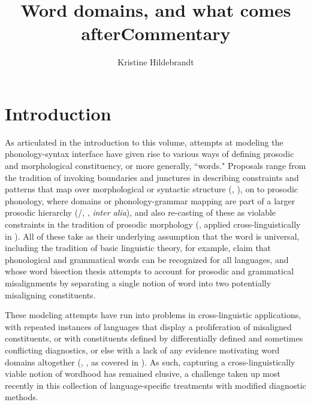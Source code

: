 \documentclass[output=paper]{langscibook}
\author{Kristine Hildebrandt\orcid{}\affiliation{Southern Illinois University Edwardsville}}
\title{Word domains, and what comes after}
\begin{document}
\maketitle 

\title{Commentary}

\section{Introduction}

As articulated in the introduction to this volume, attempts at modeling the pho\-nol\-ogy-syntax interface have given rise to various ways of defining prosodic and morphological constituency, or more generally, ``words." Proposals range from the tradition of invoking boundaries and junctures in describing constraints and patterns that map over morphological or syntactic structure (\citealt{chomsky_sound_1968}, \citealt{mccawley_phonological_1968}), on to prosodic phonology, where domains or phonology-grammar mapping are part of a larger prosodic hierarchy (\citealt{nespor_prosodic_1986}{\slash}\citeyear{nespor2007prosodic}, \citealt{truckenbrodt_relation_1999}, \textit{inter alia}), and also re-casting of these as violable constraints in the tradition of prosodic morphology (\citealt{mccarthy_prosodic_1986, mccarthy_prosodic_2001}, applied cross-linguistically in \citealt{kager1999prosody}). All of these take as their underlying assumption that the word is universal, including the tradition of basic linguistic theory, for example, \citet{dixon_basic_2010} claim that phonological and grammatical words can be recognized for all languages, and whose word bisection thesis attempts to account for prosodic and grammatical misalignments by separating a single notion of word into two potentially misaligning constituents.

These modeling attempts have run into problems in cross-linguistic applications, with repeated instances of languages that display a proliferation of misaligned constituents, or with constituents defined by differentially defined and sometimes conflicting diagnostics, or else with a lack of any evidence motivating word domains altogether (\citealt{schieringetal:2010}, \citealt{Haspelmath2011}, as covered in \citealt{Tallman2021}). As such, capturing a cross-linguistically viable notion of wordhood has remained elusive, a challenge taken up most recently in this collection of language-specific treatments with modified diagnostic methods.
\end{document}
